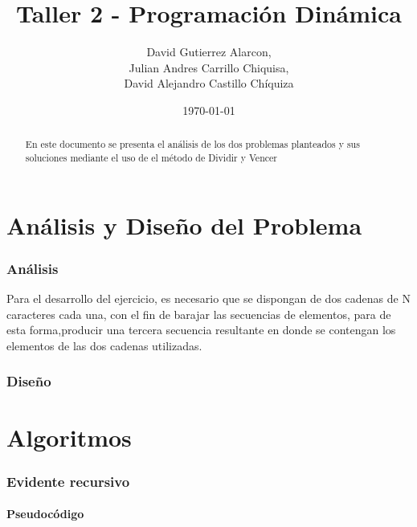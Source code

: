 \documentclass[]{article}
\numberwithin{equation}{section}
\numberwithin{figure}{section}
\theoremstyle{definition}
\begin{document}
\title{Taller 2 - Programación Dinámica}
\author{%
David Gutierrez Alarcon,\\ Julian Andres Carrillo Chiquisa,\\ David Alejandro Castillo Chíquiza}
\date{%
\today}
\maketitle

\begin{abstract}
En este documento se presenta el análisis de los dos problemas planteados y sus soluciones mediante el uso de el método de Dividir y Vencer
\end{abstract}

\part*{Análisis y Diseño del Problema}

\section*{Análisis}

\text Para el desarrollo del ejercicio, es necesario que se dispongan de dos cadenas de N caracteres cada una, con el fin de barajar las secuencias de elementos, para de esta forma,producir una tercera secuencia resultante en donde se contengan los elementos de las dos cadenas utilizadas. 

\section*{Diseño}

\text 


\part*{Algoritmos}


\section*{Evidente recursivo}
	
	\subsection*{Pseudocódigo}
	
\end{document}
